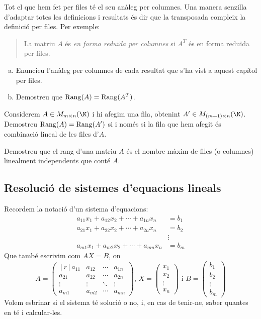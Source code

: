 \begin{exercici}
	Tot el que hem fet per files té el seu anàleg per columnes. Una manera senzilla d'adaptar totes les definicions i resultats és dir que la transposada compleix la definició per files. Per exemple:
	\begin{quote}
		La matriu $A$ és \emph{en forma reduïda per columnes} si $A^T$ és en forma reduïda per files.
	\end{quote}
	\begin{enumerate}[(a)]
		\item Enuncieu l'anàleg per columnes de cada resultat que s'ha vist a aquest capítol per files.
		\item Demostreu que $\operatorname{Rang}(A)=\operatorname{Rang}(A^T)$.
	\end{enumerate}
\end{exercici}
\begin{exercici}
	Considerem $A\in M_{m\times n}(\K)$ i hi afegim una fila, obtenint $A'\in M_{(m+1)\times n}(\K)$. Demostreu $\operatorname{Rang}(A)=\operatorname{Rang}(A')$ si i només si la fila que hem afegit és combinació lineal de les files d'$A$.
\end{exercici}
\begin{exercici}
	Demostreu que el rang d'una matriu $A$ és el nombre màxim de files (o columnes) linealment independents que conté $A$.
\end{exercici}
\subsection{Resolució de sistemes d'equacions lineals}
Recordem la notació d'un sistema d'equacions:
\begin{align*}
a_{11}x_1+a_{12}x_2+ \cdots + a_{1n}x_n &= b_1 \\
a_{21}x_1+a_{22}x_2+ \cdots + a_{2n}x_n &= b_2 \\
&\vdots \\
a_{m1}x_1+a_{m2}x_2+ \cdots + a_{mn}x_n &= b_m
\end{align*}
Que també escrivim com $AX=B$, on
\[
A=
\begin{pmatrix*}[r]
a_{11} & a_{12} & \cdots & a_{1n} \\
a_{21} & a_{22} & \cdots & a_{2n} \\
\vdots & \vdots & \ddots & \vdots \\
a_{m1} & a_{m2} & \cdots & a_{mn} 
\end{pmatrix*}\text{, }
X=
\begin{pmatrix}
x_1 \\ x_2 \\ \vdots \\ x_n
\end{pmatrix} \text{ i }
B=
\begin{pmatrix}
b_1 \\ b_2 \\ \vdots \\ b_m
\end{pmatrix}
\]
Volem esbrinar si el sistema té solució o no, i, en cas de tenir-ne, saber quantes en té i calcular-les.

